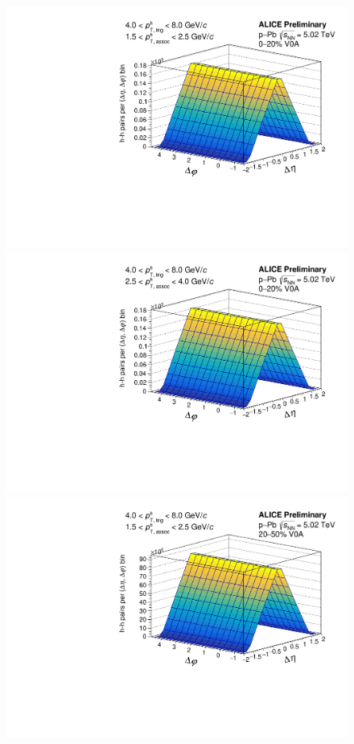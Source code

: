 \begin{figure}[ht]
	\centering
	\begin{minipage}{0.48\textwidth}
		\includegraphics[width=\textwidth]{figures/analysis/h_h_2d_mixed_fancy_label_0_20_lowpt.pdf}
	\end{minipage}
	\begin{minipage}{0.48\textwidth}
		\includegraphics[width=\textwidth]{figures/analysis/h_h_2d_mixed_fancy_label_0_20_highpt.pdf}
	\end{minipage}
	\begin{minipage}{0.48\textwidth}
		\includegraphics[width=\textwidth]{figures/analysis/h_h_2d_mixed_fancy_label_20_50_lowpt.pdf}

\end{minipage}
\end{figure}
